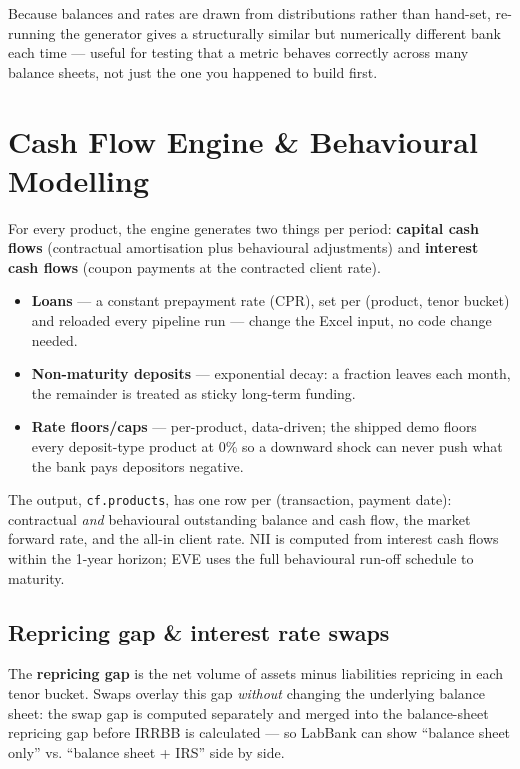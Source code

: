 \documentclass[11pt,a4paper]{article}
\begin{document}
\begin{pitchbox}
Because balances and rates are drawn from distributions rather than hand-set,
re-running the generator gives a structurally similar but numerically different
bank each time --- useful for testing that a metric behaves correctly across many
balance sheets, not just the one you happened to build first.
\end{pitchbox}

\section{Cash Flow Engine \& Behavioural Modelling}

For every product, the engine generates two things per period: \textbf{capital
cash flows} (contractual amortisation plus behavioural adjustments) and
\textbf{interest cash flows} (coupon payments at the contracted client rate).

\begin{itemize}[itemsep=2pt]
  \item \textbf{Loans} --- a constant prepayment rate (CPR), set per
        (product, tenor bucket) and reloaded every pipeline run --- change the
        Excel input, no code change needed.
  \item \textbf{Non-maturity deposits} --- exponential decay: a fraction leaves
        each month, the remainder is treated as sticky long-term funding.
  \item \textbf{Rate floors/caps} --- per-product, data-driven; the shipped
        demo floors every deposit-type product at 0\% so a downward shock can
        never push what the bank pays depositors negative.
\end{itemize}

The output, \texttt{cf.products}, has one row per (transaction, payment date):
contractual \textit{and} behavioural outstanding balance and cash flow, the
market forward rate, and the all-in client rate. NII is computed from interest
cash flows within the 1-year horizon; EVE uses the full behavioural run-off
schedule to maturity.

\subsection{Repricing gap \& interest rate swaps}
The \textbf{repricing gap} is the net volume of assets minus liabilities
repricing in each tenor bucket. Swaps overlay this gap \textit{without}
changing the underlying balance sheet: the swap gap is computed separately and
merged into the balance-sheet repricing gap before IRRBB is calculated --- so
LabBank can show ``balance sheet only'' vs. ``balance sheet + IRS'' side by side.
\end{document}
